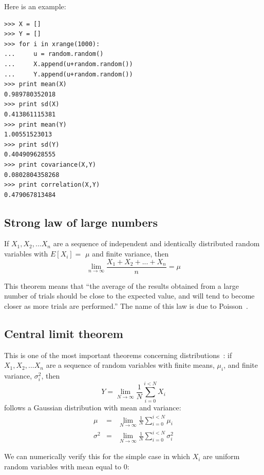 \documentclass[justified,sixbynine]{tufte-book}
\def\ft{\small\tt}
\theoremstyle{plain}%
\theoremstyle{definition}
\theoremstyle{remark}
\begin{document}
\begin{fullwidth}
Here is an example:
\begin{lstlisting}[caption={in file: {\ft nlib.py}}]
>>> X = []
>>> Y = []
>>> for i in xrange(1000):
...     u = random.random()
...     X.append(u+random.random())
...     Y.append(u+random.random())
>>> print mean(X)
0.989780352018
>>> print sd(X)
0.413861115381
>>> print mean(Y)
1.00551523013
>>> print sd(Y)
0.404909628555
>>> print covariance(X,Y)
0.0802804358268
>>> print correlation(X,Y)
0.479067813484
\end{lstlisting}

\goodbreak\subsection{Strong law of large numbers}

If $X_1,X_2,...X_n$ are a sequence of independent and identically
distributed random variables with $E[X_i]=$ $\mu $ and finite variance, then
\begin{equation}
\lim_{n\rightarrow \infty }\frac{X_1+X_2+...+X_n}n=\mu
\end{equation}

This theorem means that ``the average of the results obtained from a large number of trials should be close to the expected value, and will tend to become closer as more trials are performed.'' The name of this law is due to Poisson~\cite{largenumbers}.

\goodbreak\subsection{Central limit theorem}

This is one of the most important theorems concerning distributions~\cite{central}:
if $X_1,X_2,...X_n$ are a sequence of random variables with finite means, $\mu_i$, and finite variance, $\sigma^2_i$, then
\begin{equation}
Y = \lim_{N\rightarrow\infty}\frac1N \sum_{i=0}^{i<N} X_i
\end{equation}
follows a Gaussian distribution with mean and variance:
\begin{eqnarray}
\mu &=& \lim_{N\rightarrow\infty}\frac1N \sum_{i=0}^{i<N} \mu_i \\
\sigma^2 &=& \lim_{N\rightarrow\infty}\frac1N \sum_{i=0}^{i<N} \sigma^2_i
\end{eqnarray}

We can numerically verify this for the simple case in which $X_i$ are uniform random variables with mean equal to 0:


\end{fullwidth}
\end{document}

